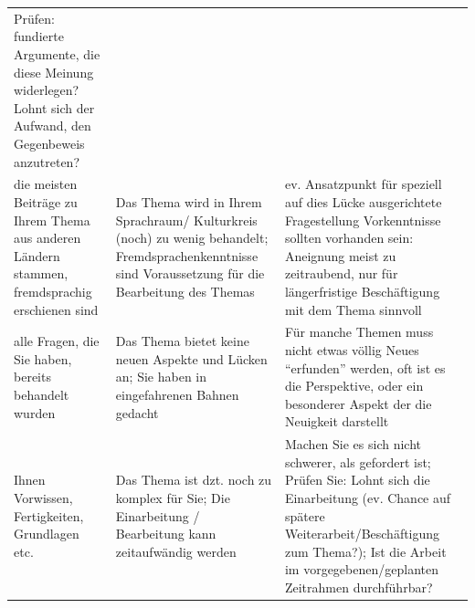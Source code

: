 \documentclass[]{book}
\theoremstyle{definition}
\theoremstyle{definition}
\theoremstyle{definition}
\theoremstyle{remark}
\begin{document}
\begin{longtable}[]{@{}lll@{}}
\begin{minipage}[t]{0.30\columnwidth}
Prüfen: fundierte Argumente, die diese Meinung widerlegen? Lohnt sich
der Aufwand, den Gegenbeweis anzutreten?\vspace{5mm}\strut
\end{minipage}\tabularnewline
\begin{minipage}[t]{0.31\columnwidth}\raggedright\strut
die meisten Beiträge zu Ihrem Thema aus anderen Ländern stammen,
fremdsprachig erschienen sind\strut
\end{minipage} & \begin{minipage}[t]{0.30\columnwidth}\raggedright\strut
Das Thema wird in Ihrem Sprachraum/ Kulturkreis (noch) zu wenig
behandelt; Fremdsprachenkenntnisse sind Voraussetzung für die
Bearbeitung des Themas\strut
\end{minipage} & \begin{minipage}[t]{0.30\columnwidth}\raggedright\strut
ev. Ansatzpunkt für speziell auf dies Lücke ausgerichtete Fragestellung
Vorkenntnisse sollten vorhanden sein: Aneignung meist zu zeitraubend,
nur für längerfristige Beschäftigung mit dem Thema
sinnvoll\vspace{5mm}\strut
\end{minipage}\tabularnewline
\begin{minipage}[t]{0.31\columnwidth}\raggedright\strut
alle Fragen, die Sie haben, bereits behandelt wurden\strut
\end{minipage} & \begin{minipage}[t]{0.30\columnwidth}\raggedright\strut
Das Thema bietet keine neuen Aspekte und Lücken an; Sie haben in
eingefahrenen Bahnen gedacht\strut
\end{minipage} & \begin{minipage}[t]{0.30\columnwidth}\raggedright\strut
Für manche Themen muss nicht etwas völlig Neues ``erfunden'' werden, oft
ist es die Perspektive, oder ein besonderer Aspekt der die Neuigkeit
darstellt\vspace{5mm}\strut
\end{minipage}\tabularnewline
\begin{minipage}[t]{0.31\columnwidth}\raggedright\strut
Ihnen Vorwissen, Fertigkeiten, Grundlagen etc.\strut
\end{minipage} & \begin{minipage}[t]{0.30\columnwidth}\raggedright\strut
Das Thema ist dzt. noch zu komplex für Sie; Die Einarbeitung /
Bearbeitung kann zeitaufwändig werden\strut
\end{minipage} & \begin{minipage}[t]{0.30\columnwidth}\raggedright\strut
Machen Sie es sich nicht schwerer, als gefordert ist; Prüfen Sie: Lohnt
sich die Einarbeitung (ev. Chance auf spätere Weiterarbeit/Beschäftigung
zum Thema?); Ist die Arbeit im vorgegebenen/geplanten Zeitrahmen
durchführbar?\vspace{5mm}\strut
\end{minipage}\tabularnewline
\bottomrule
\end{longtable}
\end{document}

